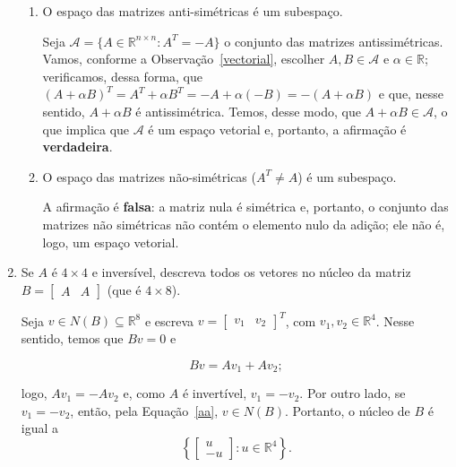 \documentclass[leqno]{article}
\begin{document}
\begin{enumerate}
\begin{enumerate}
            \item O espaço das matrizes anti-simétricas é um subespaço.
	    
            \begin{sol} 
		    Seja $\mathcal{A} = \{A \in \mathbb{R}^{n \times n} : A^{T} = -A\}$ o conjunto das matrizes antissimétricas. Vamos, conforme a Observação~\ref{vectorial}, escolher $A, B \in \mathcal{A}$ e $\alpha \in \mathbb{R}$; verificamos, dessa forma, que $(A + \alpha B)^{T} = A^{T} + \alpha B^{T} = -A + \alpha (-B) = -(A + \alpha B)$ e que, nesse sentido, $A + \alpha B$ é antissimétrica. Temos, desse modo, que $A + \alpha B \in \mathcal{A}$, o que implica que $\mathcal{A}$ é um espaço vetorial e, portanto, a afirmação é \textbf{verdadeira}.  
	    \end{sol} 

            \item O espaço das matrizes não-simétricas ($A^T \neq A$) é um subespaço.
	    
	    \begin{sol} 
	    	A afirmação é \textbf{falsa}: a matriz nula é simétrica e, portanto, o conjunto das matrizes não simétricas não contém o elemento nulo da adição; ele não é, logo, um espaço vetorial.  
	    \end{sol} 

        \end{enumerate}

    \item Se $A$ é $4\times 4$ e inversível, descreva todos os vetores no núcleo da matriz $B = \begin{bmatrix}A & A \end{bmatrix}$ (que é $4\times 8$).
    
    \begin{sol} 
	    Seja $v \in N(B) \subseteq \mathbb{R}^{8}$ e escreva $v = \begin{bmatrix} v_{1} & v_{2} \end{bmatrix}^{T}$, com $v_{1}, v_{2} \in \mathbb{R}^{4}$. Nesse sentido, temos que $Bv = 0$ e 

	    \begin{equation} \label{aa}  
		    Bv = Av_{1} + Av_{2};     
	    \end{equation} 

	    \noindent logo, $Av_{1} = -Av_{2}$ e, como $A$ é invertível, $v_{1} = -v_{2}$. Por outro lado, se $v_{1} = -v_{2}$, então, pela Equação~\eqref{aa}, $v \in N(B)$. Portanto, o núcleo de $B$ é igual a 
	    \begin{equation*} 
		    \left\{
			\begin{bmatrix} 
				u \\  
				-u 
			\end{bmatrix} : 
			u \in \mathbb{R}^{4} 
		    \right\}. 
	    \end{equation*} 
    \end{sol} 


\end{enumerate}
\end{document}
